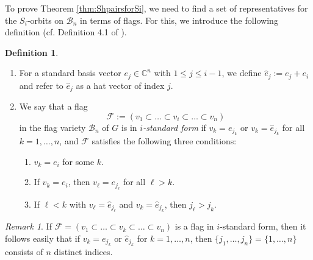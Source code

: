 \documentclass[12pt]{amsart}
\numberwithin{equation}{section}
\theoremstyle{remark}
\newtheorem{rem}[thm]{Remark}
\theoremstyle{definition}
\newtheorem{dfn}[thm]{Definition}
\newtheorem{dfn-nota}[thm]{Definition-Notation}
\newcommand{\C}{\mbox{${\mathbb C}$}}
\newcommand{\B}{\mathcal{B}}
\newcommand{\he}{\hat{e}}
\begin{document}
To prove Theorem \ref{thm:ShpairsforSi}, we need to find a set of 
representatives for the $S_{i}$-orbits on $\B_{n}$ in terms of flags.  For this, we introduce the following definition (cf. Definition 4.1 of \cite{CE21II}).  
\begin{dfn}\label{d:istd}
\begin{enumerate}
\item For a standard basis vector $e_{j}\in\C^{n}$ with $1\leq j\leq i-1$, we define $\he_{j}:=e_{j}+e_{i}$ and refer to $\he_{j}$ as a hat vector of index $j.$
\item We say that a flag 
\begin{equation}\label{eq:basicflag}
\mathcal{F}:=(v_{1}\subset \dots \subset v_{i}\subset\dots\subset v_{n})
\end{equation}
in the flag variety $\B_{n}$ of $G$
is in \emph{$i$-standard form} if $v_{k}=e_{j_{k}}$ or $v_{k}=\he_{j_{k}}$ for all $k=1,\dots, n$, and 
$\mathcal{F}$ satisfies the following three conditions:
\begin{enumerate}
\item $v_k = e_i$ for some $k$.
\item If $v_{k}=e_{i}$, then $v_{\ell}=e_{j_{\ell}}$ for all $\ell>k$.
 \item If $\ell<k$ with $v_{\ell}=\he_{j_{\ell}}$ and $v_{k}=\he_{j_{k}}$, then $j_{\ell}>j_{k}$. 
\end{enumerate}
\end{enumerate}
\end{dfn}

\begin{rem}\label{r.glstandard}
If $\mathcal{F}=(v_{1}\subset \dots \subset v_{k}\subset\dots\subset v_{n})$ is a flag in $i$-standard form, then it follows easily that if $v_{k} = e_{j_{k}}$ or $\he_{j_{k}}$ for $k=1,\dots, n$, then $\{ j_1, \dots, j_n \} = \{ 1, \dots, n \}$ consists of $n$ distinct indices.
\end{rem}
\end{document}
